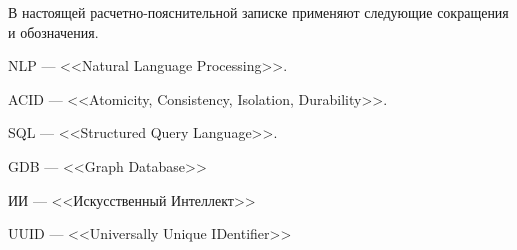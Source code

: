 
В настоящей расчетно-пояснительной записке применяют следующие сокращения и обозначения.\\

\begin{description}	
	\item{NLP} --- <<Natural Language Processing>>.
	\item{ACID} --- <<Atomicity, Consistency, Isolation, Durability>>.
	\item{SQL} --- <<Structured Query Language>>.
	\item{GDB} --- <<Graph Database>>
	\item{ИИ} --- <<Искусственный Интеллект>>
	\item{UUID} --- <<Universally Unique IDentifier>>
\end{description}
